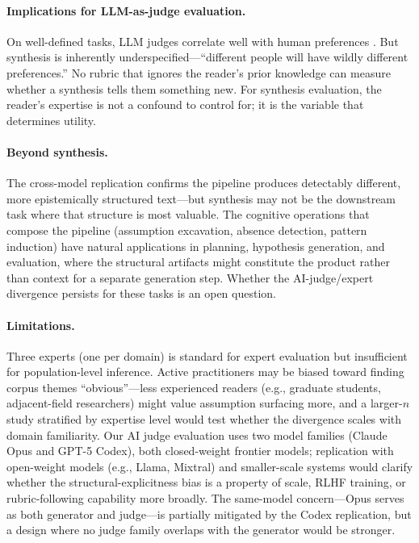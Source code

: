 \documentclass{article}
\begin{document}
\paragraph{Implications for LLM-as-judge evaluation.} On well-defined tasks, LLM judges correlate well with human preferences \citep{zheng2023judging}. But synthesis is inherently underspecified---``different people will have wildly different preferences.'' No rubric that ignores the reader's prior knowledge can measure whether a synthesis tells them something new. For synthesis evaluation, the reader's expertise is not a confound to control for; it is the variable that determines utility.

\paragraph{Beyond synthesis.} The cross-model replication confirms the pipeline produces detectably different, more epistemically structured text---but synthesis may not be the downstream task where that structure is most valuable. The cognitive operations that compose the pipeline (assumption excavation, absence detection, pattern induction) have natural applications in planning, hypothesis generation, and evaluation, where the structural artifacts might constitute the product rather than context for a separate generation step. Whether the AI-judge/expert divergence persists for these tasks is an open question.

\paragraph{Limitations.} Three experts (one per domain) is standard for expert evaluation but insufficient for population-level inference. Active practitioners may be biased toward finding corpus themes ``obvious''---less experienced readers (e.g., graduate students, adjacent-field researchers) might value assumption surfacing more, and a larger-$n$ study stratified by expertise level would test whether the divergence scales with domain familiarity. Our AI judge evaluation uses two model families (Claude Opus and GPT-5 Codex), both closed-weight frontier models; replication with open-weight models (e.g., Llama, Mixtral) and smaller-scale systems would clarify whether the structural-explicitness bias is a property of scale, RLHF training, or rubric-following capability more broadly. The same-model concern---Opus serves as both generator and judge---is partially mitigated by the Codex replication, but a design where no judge family overlaps with the generator would be stronger.
\end{document}
